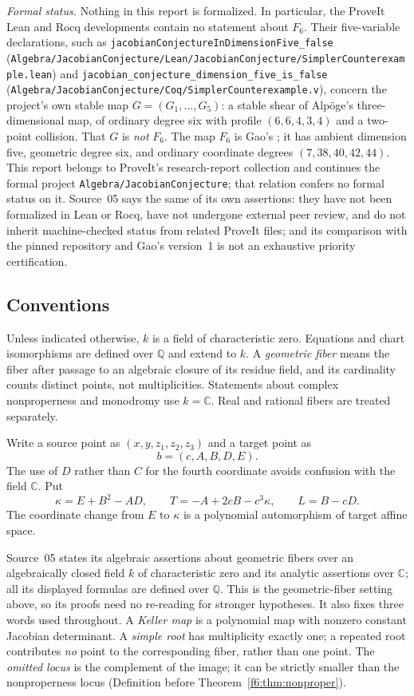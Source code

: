 \documentclass[11pt,a4paper]{article}
\theoremstyle{definition}
\newcommand{\C}{\mathbb C}
\newcommand{\Q}{\mathbb Q}
\newcommand{\kk}{\kappa}
\newcommand{\code}[1]{\texttt{\nolinkurl{#1}}}
\begin{document}
\emph{Formal status.} Nothing in this report is formalized. In particular,
the ProveIt Lean and Rocq developments contain no statement about $F_6$.
Their five-variable declarations, such as
\code{jacobianConjectureInDimensionFive_false}
(\code{Algebra/JacobianConjecture/Lean/JacobianConjecture/SimplerCounterexample.lean})
and \code{jacobian_conjecture_dimension_five_is_false}
(\code{Algebra/JacobianConjecture/Coq/SimplerCounterexample.v}), concern the
project's own stable map
$G=(G_1,\dots,G_5)$: a stable shear of Alpöge's three-dimensional map, of
ordinary degree six with profile $(6,6,4,3,4)$ and a two-point collision. That
$G$ is \emph{not} $F_6$. The map $F_6$ is Gao's \cite{Gao}; it has ambient
dimension five, geometric degree six, and ordinary coordinate degrees
$(7,38,40,42,44)$. This report belongs to ProveIt's research-report
collection and continues the formal project \code{Algebra/JacobianConjecture};
that relation confers no formal status on it. Source~05 says the same of its
own assertions: they have not been formalized in Lean or Rocq, have not
undergone external peer review, and do not inherit machine-checked status
from related ProveIt files; and its comparison with the pinned repository
and Gao's version~1 is not an exhaustive priority certification.

\subsection{Conventions}
Unless indicated otherwise, $k$ is a field of characteristic zero. Equations
and chart isomorphisms are defined over $\Q$ and extend to $k$. A
\emph{geometric fiber} means the fiber after passage to an algebraic
closure of its residue field, and its cardinality counts distinct points,
not multiplicities. Statements about complex nonproperness and monodromy
use $k=\C$. Real and rational fibers are treated separately.

Write a source point as $(x,y,z_1,z_2,z_3)$ and a target point as
\[
 b=(c,A,B,D,E).
\]
The use of $D$ rather than $C$ for the fourth coordinate avoids confusion
with the field $\C$. Put
\begin{equation}\label{f6:eq:TL}
 \kk=E+B^2-AD,\qquad T=-A+2cB-c^3\kk,\qquad L=B-cD.
\end{equation}
The coordinate change from $E$ to $\kk$ is a polynomial automorphism of
target affine space.

Source~05 states its algebraic assertions about geometric fibers over an
algebraically closed field $k$ of characteristic zero and its analytic
assertions over $\C$; all its displayed formulas are defined over $\Q$. This
is the geometric-fiber setting above, so its proofs need no re-reading for
stronger hypotheses. It also fixes three words used throughout. A
\emph{Keller map} is a polynomial map with nonzero constant Jacobian
determinant. A \emph{simple root} has multiplicity exactly one; a repeated
root contributes \emph{no} point to the corresponding fiber, rather than one
point. The \emph{omitted locus} is the complement of the image; it can be
strictly smaller than the nonproperness locus (Definition before
Theorem~\ref{f6:thm:nonproper}).
\end{document}
